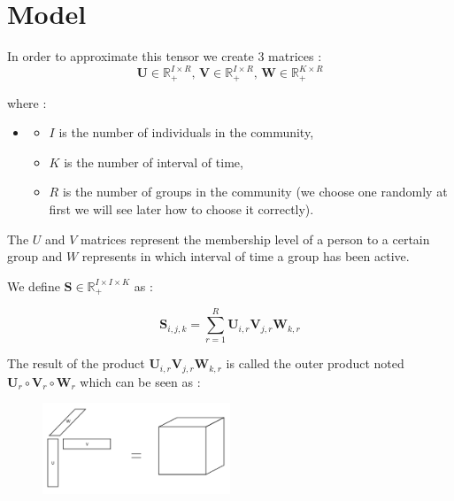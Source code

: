 \documentclass{article}
\begin{document}
\section{Model}

In order to approximate this tensor we create 3 matrices :
\[
    \mathbf{U} \in \mathbb{R}_+^{I \times R}, \,
    \mathbf{V} \in \mathbb{R}_+^{I \times R}, \,
    \mathbf{W} \in \mathbb{R}_+^{K \times R}
\]

where :
\begin{itemize}
    \item[]
    \begin{itemize}
        \item $I$ is the number of individuals in the community,
        \item $K$ is the number of interval of time,
        \item $R$ is the number of groups in the community (we choose one randomly at first we will see later how to choose it correctly).
    \end{itemize}
\end{itemize}

The $U$ and $V$ matrices represent the membership level of a person to a certain group
and $W$ represents in which interval of time a group has been active.




We define $\mathbf{S} \in \mathbb{R}_+^{I \times I \times K}$ as :

\[
    \mathbf{S}_{i,j,k} = \sum_{r = 1}^R \mathbf{U}_{i,r}\mathbf{V}_{j,r}\mathbf{W}_{k, r}
\]

The result of the product $\mathbf{U}_{i,r}\mathbf{V}_{j,r}\mathbf{W}_{k, r}$ is called the outer product noted $\mathbf{U}_r \circ \mathbf{V}_r \circ \mathbf{W}_r$ which can be seen as :

\begin{figure}[H]
    \centering
    \includegraphics[width=0.5\textwidth]{images/outer_product.png}
\end{figure}
\end{document}
